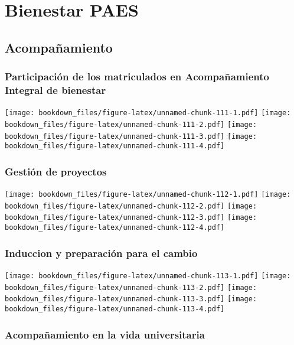 \documentclass[]{article}
\theoremstyle{definition}
\theoremstyle{definition}
\theoremstyle{definition}
\theoremstyle{remark}
\begin{document}
\section{Bienestar PAES}\label{bienestar-paes}

\subsection{Acompañamiento}\label{acompanamiento}

\subsubsection{Participación de los matriculados en Acompañamiento
Integral de
bienestar}\label{participacion-de-los-matriculados-en-acompanamiento-integral-de-bienestar}

\texttt{[image: bookdown\_files/figure-latex/unnamed-chunk-111-1.pdf]}
\texttt{[image: bookdown\_files/figure-latex/unnamed-chunk-111-2.pdf]}
\texttt{[image: bookdown\_files/figure-latex/unnamed-chunk-111-3.pdf]}
\texttt{[image: bookdown\_files/figure-latex/unnamed-chunk-111-4.pdf]}

\subsubsection{Gestión de proyectos}\label{gestion-de-proyectos}

\texttt{[image: bookdown\_files/figure-latex/unnamed-chunk-112-1.pdf]}
\texttt{[image: bookdown\_files/figure-latex/unnamed-chunk-112-2.pdf]}
\texttt{[image: bookdown\_files/figure-latex/unnamed-chunk-112-3.pdf]}
\texttt{[image: bookdown\_files/figure-latex/unnamed-chunk-112-4.pdf]}

\subsubsection{Induccion y preparación para el
cambio}\label{induccion-y-preparacion-para-el-cambio}

\texttt{[image: bookdown\_files/figure-latex/unnamed-chunk-113-1.pdf]}
\texttt{[image: bookdown\_files/figure-latex/unnamed-chunk-113-2.pdf]}
\texttt{[image: bookdown\_files/figure-latex/unnamed-chunk-113-3.pdf]}
\texttt{[image: bookdown\_files/figure-latex/unnamed-chunk-113-4.pdf]}

\subsubsection{Acompañamiento en la vida
universitaria}\label{acompanamiento-en-la-vida-universitaria}
\end{document}
